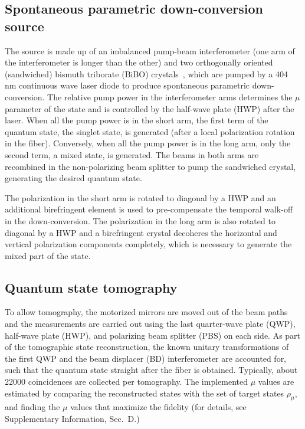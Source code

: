 \documentclass[aps,prx,twocolumn,superscriptaddress]{revtex4-1}
\theoremstyle{plain}
\begin{document}
\subsection{Spontaneous parametric down-conversion source}
The source is made up of an imbalanced pump-beam interferometer (one arm of the interferometer is longer than the other) and two orthogonally oriented (sandwiched) bismuth triborate (BiBO) crystals~\cite{altepeter05}, which are pumped by a 404 nm continuous wave laser diode to produce spontaneous parametric down-conversion. The relative pump power in the interferometer arms determines the $\mu$ parameter of the state and is controlled by the half-wave plate (HWP) after the laser. When all the pump power is in the short arm, the first term of the quantum state, the singlet state, is generated (after a local polarization rotation in the fiber). Conversely, when all the pump power is in the long arm, only the second term, a mixed state, is generated. The beams in both arms are recombined in the non-polarizing beam splitter to pump the sandwiched crystal, generating the desired quantum state.

The polarization in the short arm is rotated to diagonal by a HWP and an additional birefringent element is used to pre-compensate the temporal walk-off in the down-conversion. The polarization in the long arm is also rotated to diagonal by a HWP and a birefringent crystal decoheres the horizontal and vertical polarization components completely, which is necessary to generate the mixed part of the state.

\subsection{Quantum state tomography}

To allow tomography, the motorized mirrors are moved out of the beam paths and the measurements are carried out using the last quarter-wave plate (QWP), half-wave plate (HWP), and polarizing beam splitter (PBS) on each side. As part of the tomographic state reconstruction, the known unitary transformations of the first QWP and the beam displacer (BD) interferometer are accounted for, such that the quantum state straight after the fiber is obtained.  Typically, about 22000 coincidences are collected per tomography.  
The implemented $\mu$ values are estimated by comparing the reconstructed states with the set of target states $\rho_{\mu}$, and finding the $\mu$ values that maximize the fidelity (for details, see Supplementary Information, Sec.\ D.) 
\end{document}
